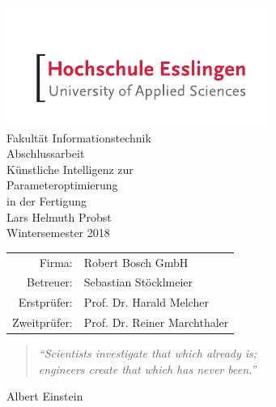 

\usepackage[T1]{fontenc}
\usepackage[utf8]{inputenc}
\usepackage{graphicx}





\begin{titlepage}
\begin{center}
\includegraphics[scale=2.5]{images/he_logo.pdf}\\
\vspace{1cm} Fakultät Informationstechnik\\
\vspace{1.5cm} \Large Abschlussarbeit \\
\vspace{1.5cm} \Huge Künstliche Intelligenz zur \\ Parameteroptimierung \\ in der Fertigung\\
\vspace{1.5cm} \Large Lars Helmuth Probst\\\normalsize
\vspace{0.5cm} Wintersemester 2018\\\normalsize
\vfill{}
\begin{tabular}{rl}
Firma: & Robert Bosch GmbH\\[0.5cm]
Betreuer: & Sebastian Stöcklmeier\\[0.5cm]
Erstprüfer: & Prof. Dr. Harald Melcher\\[0.5cm]
Zweitprüfer: & Prof. Dr. Reiner Marchthaler\\
\end{tabular}
\end{center}
\end{titlepage}

\thispagestyle{empty}
\vspace*{2cm}
\begin{center}
\begin{minipage}{12cm}
\begin{center}
\end{center}
\end{minipage}

\vfill{}

\begin{minipage}{10cm}
\begin{quote}
\textit{"`Scientists investigate that which already is;\\ engineers create that which has never been."'}
\end{quote}
\hfill Albert Einstein
\end{minipage}
\end{center}

